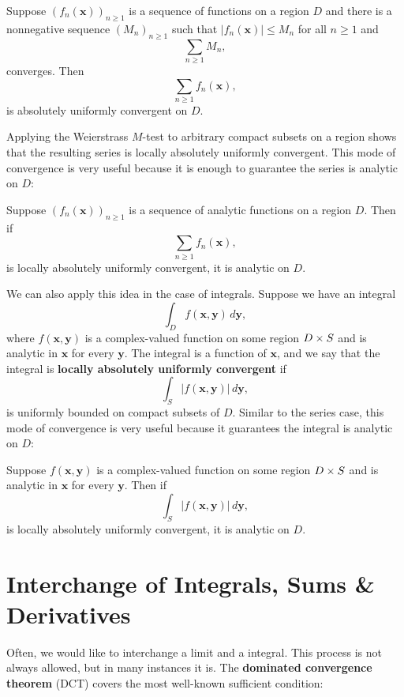     \begin{theorem*}
      Suppose $(f_{n}(\mathbf{x}))_{n \ge 1}$ is a sequence of functions on a region $D$ and there is a nonnegative sequence $(M_{n})_{n \ge 1}$ such that $|f_{n}(\mathbf{x})| \le M_{n}$ for all $n \ge 1$ and
      \[
        \sum_{n \ge 1}M_{n},
      \]
      converges. Then
      \[
        \sum_{n \ge 1}f_{n}(\mathbf{x}),
      \]
      is absolutely uniformly convergent on $D$.
    \end{theorem*}

    Applying the Weierstrass $M$-test to arbitrary compact subsets on a region shows that the resulting series is locally absolutely uniformly convergent. This mode of convergence is very useful because it is enough to guarantee the series is analytic on $D$:

    \begin{theorem}
      Suppose $(f_{n}(\mathbf{x}))_{n \ge 1}$ is a sequence of analytic functions on a region $D$. Then if
      \[
        \sum_{n \ge 1}f_{n}(\mathbf{x}),
      \]
      is locally absolutely uniformly convergent, it is analytic on $D$.
    \end{theorem}

    We can also apply this idea in the case of integrals. Suppose we have an integral
    \[
      \int_{D}f(\mathbf{x},\mathbf{y})\,d\mathbf{y},
    \]
    where $f(\mathbf{x},\mathbf{y})$ is a complex-valued function on some region $D \times S$ and is analytic in $\mathbf{x}$ for every $\mathbf{y}$. The integral is a function of $\mathbf{x}$, and we say that the integral is \textbf{locally absolutely uniformly convergent} if
    \[
      \int_{S}|f(\mathbf{x},\mathbf{y})|\,d\mathbf{y},
    \]
    is uniformly bounded on compact subsets of $D$. Similar to the series case, this mode of convergence is very useful because it guarantees the integral is analytic on $D$:

    \begin{theorem}\label{thm:analytic_integral}
      Suppose $f(\mathbf{x},\mathbf{y})$ is a complex-valued function on some region $D \times S$ and is analytic in $\mathbf{x}$ for every $\mathbf{y}$. Then if
      \[
        \int_{S}|f(\mathbf{x},\mathbf{y})|\,d\mathbf{y},
      \]
      is locally absolutely uniformly convergent, it is analytic on $D$.
    \end{theorem}
  \section{Interchange of Integrals, Sums \& Derivatives}
    Often, we would like to interchange a limit and a integral. This process is not always allowed, but in many instances it is. The \textbf{dominated convergence theorem} (DCT) covers the most well-known sufficient condition:

